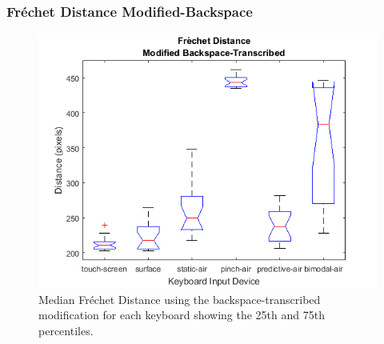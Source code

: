 \subsubsection{Fr\'echet Distance Modified-Backspace}
\begin{figure}[h]
	\centering
	\includegraphics{fig_frechet_back_boxplot}
	\caption[Fr\'echet Distance Boxplot for Modified-Backspace]{Median Fr\'echet Distance using the backspace-transcribed modification for each keyboard showing the 25th and 75th percentiles.}
	\label{fig_frechet_back_boxplot}
\end{figure}

